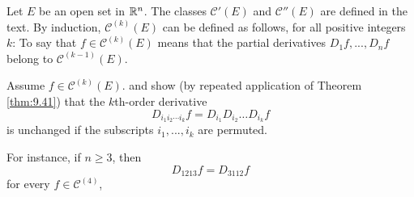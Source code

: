 \begin{myExercise}
    \label{ex:9.29}
    Let $E$ be an open set in ${\protect\mathbb R}^n$. 
    The classes $\mathscr{C}'(E)$ and $\mathscr{C}''(E)$ are defined in the text.
    By induction, $\mathscr{C}^{(k)} (E)$ can be defined as follows, for all positive integers $k$: 
    To say that $f \in \mathscr{C}^{(k)} (E)$ means that the partial derivatives $D_1 f, ... , D_n f$ belong to $\mathscr{C}^{(k-1)} (E)$.

    Assume $f \in \mathscr{C}^{(k)} (E)$. and show 
    (by repeated application of Theorem \ref{thm:9.41}) 
    that the $k$th-order derivative
    \begin{equation*}
        D_{i_1 i_2 \cdots i_k} f = D_{i_1} D_{i_2} \dots D_{i_k} f
    \end{equation*}
    is unchanged if the subscripts $i_1, ... , i_k$ are permuted.

    For instance, if $n \geq 3$, then
    \begin{equation*}
        D_{1213} f = D_{3112} f
    \end{equation*}
    for every $f \in \mathscr{C}^{(4)}$,
\end{myExercise}


